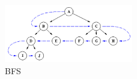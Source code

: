 \begin{figure}[htb]
    \centering
    \includegraphics[width=0.5\textwidth]{images/BFS.png}
    \caption{BFS}
    \label{figure:BFS}
\end{figure}
